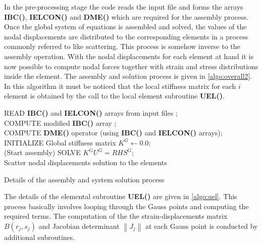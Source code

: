 In the pre-processing stage the code reads the input file and forms the arrays {\bf IBC()}, {\bf IELCON()} and {\bf DME()} which are required for the assembly process. Once the global system of equations is assembled and solved, the values of the nodal displacements are distributed to the corresponding elements in a process commonly referred to like scattering. This process is somehow inverse to the assembly operation. With the nodal displacements for each element at hand it is now possible to compute nodal forces together with strain and stress distributions inside the element. The assembly and solution process is given in \cref{algo:overall2}. In this algorithm it must be noticed that the local stiffness matrix for each $i$ element is obtained by the call to the local element subroutine {\bf UEL()}.

\begin{algorithm}[H]
\SetAlgoLined
{}
\BlankLine
READ {\bf IBC()} and {\bf IELCON()} arrays from input files ;\\
COMPUTE modified {\bf IBC()} array ;\\
COMPUTE {\bf DME()} operator (using {\bf IBC()} and {\bf IELCON()} arrays);\\
INITIALIZE Global stiffness matrix $K^G \leftarrow 0.0$;\\
(Start assembly)
\BlankLine
{}
\BlankLine
SOLVE ${K^G}{U^G} = RH{S^G}$;\\
Scatter nodal displacements solution to the elements
\caption{Details of the assembly and system solution process}
\label{algo:overall2}
\end{algorithm}

The details of the elemental subroutine {\bf UEL()} are given in \cref{algo:uel}. This process basically involves looping through the Gauss points and computing the required terms. The computation of the the strain-displacements matrix $B(r_j , s_j )$ and Jacobian determinant $\left\|J_j\right\|$ at each Gauss point is conducted by additional subroutines.

